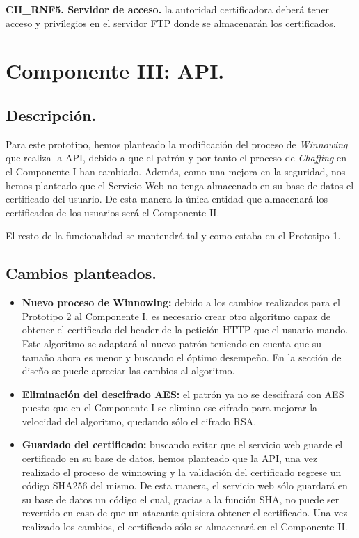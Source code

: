 \documentclass[12pt, a4paper, titlepage]{report}
\begin{document}
            \setlength{\parindent}{0cm}
        
            \textbf{CII\_RNF5. Servidor de acceso.} la autoridad certificadora deberá tener acceso y privilegios en el servidor FTP donde se almacenarán los certificados.
            
	        
        \section{Componente III: API.}
            \subsection{Descripción.}
        
                Para este prototipo, hemos planteado la modificación del proceso de \textit{Winnowing} que realiza la API, debido a que el patrón y por tanto el proceso de \textit{Chaffing} en el Componente I han cambiado. Además, como una mejora en la seguridad, nos hemos planteado que el Servicio Web no tenga almacenado en su base de datos el certificado del usuario. De esta manera la única entidad que almacenará los certificados de los usuarios será el Componente II.
                
                El resto de la funcionalidad se mantendrá tal y como estaba en el Prototipo 1. 
               
            \subsection{Cambios planteados.}
	            
	            \begin{itemize}
	                \item \textbf{Nuevo proceso de Winnowing: } debido a los cambios realizados para el Prototipo 2 al Componente I, es necesario crear otro algoritmo capaz de obtener el certificado del header de la petición HTTP que el usuario mando. Este algoritmo se adaptará al nuevo patrón teniendo en cuenta que su tamaño ahora es menor y buscando el óptimo desempeño. En la sección de diseño se puede apreciar las cambios al algoritmo.
	                \item \textbf{Eliminación del descifrado AES: } el patrón ya no se descifrará con AES puesto que en el Componente I se elimino ese cifrado para mejorar la velocidad del algoritmo, quedando sólo el cifrado RSA.
	                \item \textbf{Guardado del certificado: } buscando evitar que el servicio web guarde el certificado en su base de datos, hemos planteado que la API, una vez realizado el proceso de winnowing y la validación del certificado regrese un código SHA256 del mismo. De esta manera, el servicio web sólo guardará en su base de datos un código el cual, gracias a la función SHA, no puede ser revertido en caso de que un atacante quisiera obtener el certificado. Una vez realizado los cambios, el certificado sólo se almacenará en el Componente II.
	            \end{itemize}
	            
\end{document}
